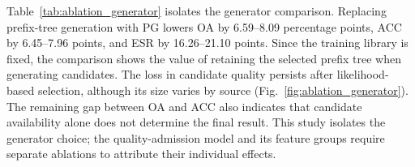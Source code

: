 Table~\ref{tab:ablation_generator} isolates the generator comparison.
Replacing prefix-tree generation with PG lowers OA by 6.59--8.09
percentage points, ACC by 6.45--7.96 points, and ESR by
16.26--21.10 points. Since the training library is fixed, the
comparison shows the value of retaining the selected prefix tree
when generating candidates. The loss in candidate quality persists
after likelihood-based selection, although its size varies by
source (Fig.~\ref{fig:ablation_generator}). The remaining gap
between OA and ACC also indicates that candidate availability alone
does not determine the final result. This study isolates the
generator choice; the quality-admission model and its feature groups
require separate ablations to attribute their individual effects.
